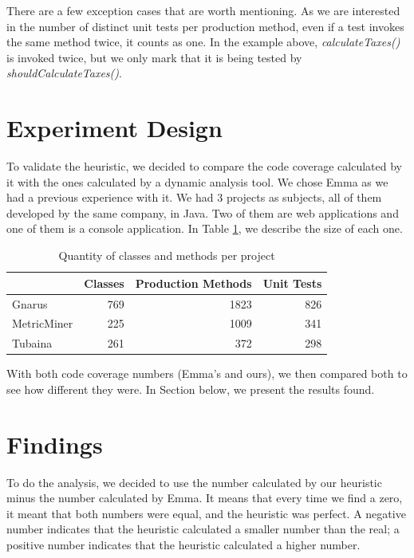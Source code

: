 \documentclass{sig-alternate}
\begin{document}
There are a few exception cases that are worth mentioning. 
As we are
interested in the number of distinct unit tests per production method, even if a test invokes the same method twice, it
counts as one. In the example above, \textit{calculateTaxes()} is invoked twice, but we only mark that it is being
tested by \textit{shouldCalculateTaxes()}.

\section{Experiment Design}

To validate the heuristic, we decided to compare the code coverage calculated by it with the ones 
calculated by a dynamic analysis tool. We chose Emma as we had a previous experience with it. We
had 3 projects as subjects, all of them developed by the same company, in Java. Two of them are
web applications and one of them is a console application. In Table \ref{tab:projects}, we describe
the size of each one.

\begin{table}[h!]
\centering
\caption{Quantity of classes and methods per project}
\begin{tabular}{ | l | r | r | r | }
\hline
& Classes & Production Methods & Unit Tests\\ 
\hline
Gnarus & 769 & 1823 & 826\\ 
MetricMiner & 225 & 1009 & 341\\ 
Tubaina & 261 & 372 & 298\\ 

\hline
\end{tabular}
\label{tab:projects}
\end{table}

With both code coverage numbers (Emma's and ours), we then compared both to see how different
they were. In Section below, we present the results found.

\section{Findings}

To do the analysis, we decided to use the number calculated by our heuristic minus the
number calculated by Emma. It means that every time we find a zero, it meant that both numbers
were equal, and the heuristic was perfect. A negative number indicates that the heuristic calculated
a smaller number than the real; a positive number indicates that the heuristic calculated a higher
number.
\end{document}
